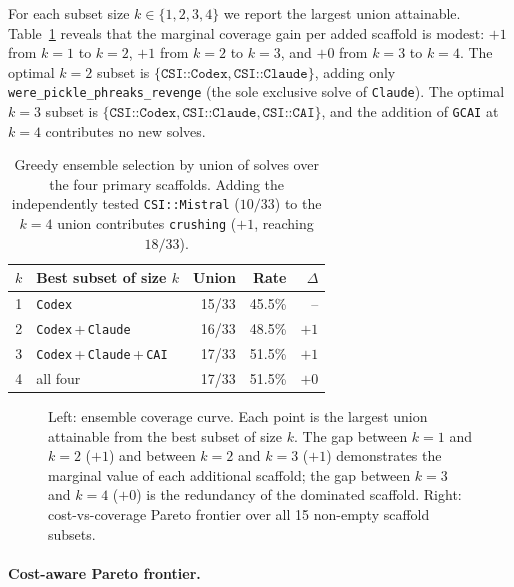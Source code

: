 For each subset size $k \in \{1, 2, 3, 4\}$ we report the largest union attainable. Table~\ref{tab:ensemble} reveals that the marginal coverage gain per added scaffold is modest: $+1$ from $k=1$ to $k=2$, $+1$ from $k=2$ to $k=3$, and $+0$ from $k=3$ to $k=4$. The optimal $k=2$ subset is $\{\texttt{CSI::Codex}, \texttt{CSI::Claude}\}$, adding only \texttt{were\_pickle\_phreaks\_revenge} (the sole exclusive solve of \texttt{Claude}). The optimal $k=3$ subset is $\{\texttt{CSI::Codex}, \texttt{CSI::Claude}, \texttt{CSI::CAI}\}$, and the addition of \texttt{GCAI} at $k=4$ contributes no new solves.

\begin{table}[t]
\centering
\footnotesize
\setlength{\tabcolsep}{4pt}
\renewcommand{\arraystretch}{1.05}
\begin{tabular*}{\columnwidth}{@{\extracolsep{\fill}}clrrr@{}}
\toprule
$k$ & Best subset of size $k$ & Union & Rate & $\Delta$ \\
\midrule
1 & \texttt{Codex}                          & 15/33 & 45.5\% & --   \\
2 & \texttt{Codex}\,+\,\texttt{Claude}      & 16/33 & 48.5\% & $+1$ \\
3 & \texttt{Codex}\,+\,\texttt{Claude}\,+\,\texttt{CAI} & 17/33 & 51.5\% & $+1$ \\
4 & all four                                & 17/33 & 51.5\% & $+0$ \\
\bottomrule
\end{tabular*}
\caption{Greedy ensemble selection by union of solves over the four primary scaffolds. Adding the independently tested \texttt{CSI::Mistral} ($10/33$) to the $k{=}4$ union contributes \texttt{crushing} ($+1$, reaching $18/33$).}\label{tab:ensemble}
\end{table}

\begin{figure}[t]
\centering
\resizebox{0.96\textwidth}{!}{}
\caption{Left: ensemble coverage curve. Each point is the largest union attainable from the best subset of size $k$. The gap between $k{=}1$ and $k{=}2$ ($+1$) and between $k{=}2$ and $k{=}3$ ($+1$) demonstrates the marginal value of each additional scaffold; the gap between $k{=}3$ and $k{=}4$ ($+0$) is the redundancy of the dominated scaffold. Right: cost-vs-coverage Pareto frontier over all 15 non-empty scaffold subsets.}
\label{fig:ensemble}
\end{figure}

\paragraph{Cost-aware Pareto frontier.}\label{sec:pareto}

